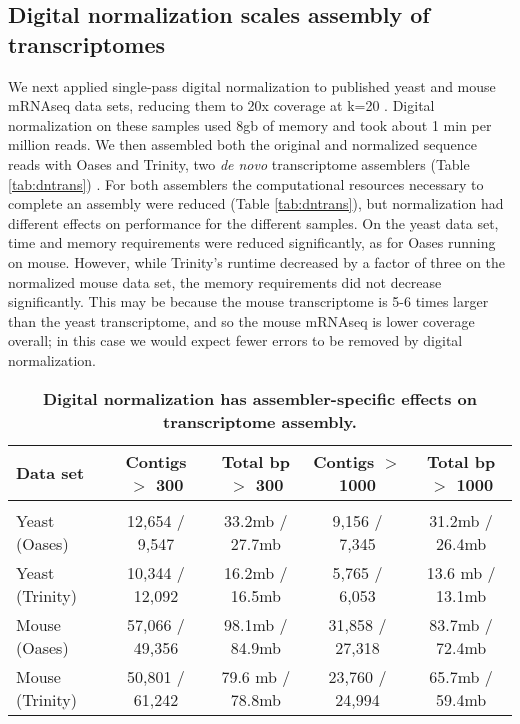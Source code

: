 \subsection{Digital normalization scales assembly of transcriptomes}


We next applied single-pass digital normalization to published yeast and mouse
mRNAseq data sets, reducing them to 20x coverage at k=20 \cite{pubmed21572440}.
Digital normalization on these samples used 8gb of memory and took about 1 min
per million reads.  We then assembled both the original and normalized sequence
reads with Oases and Trinity, two {\em de novo} transcriptome assemblers (Table
\ref{tab:dntrans}) \cite{pubmed22368243,pubmed21572440}.
%
For both assemblers the computational resources necessary to complete an
assembly were reduced (Table \ref{tab:dntrans}), but normalization had
different effects on performance for the different samples.  On the yeast data
set, time and memory requirements were reduced significantly, as for Oases
running on mouse.  However, while Trinity's runtime decreased by a factor of
three on the normalized mouse data set, the memory requirements did not
decrease significantly.  This may be because the mouse transcriptome is 5-6
times larger than the yeast transcriptome, and so the mouse mRNAseq is lower
coverage overall; in this case we would expect fewer errors to be removed by
digital normalization.


\begin{table}[!ht]
\small
\caption{
\bf{Digital normalization has assembler-specific effects on transcriptome
assembly.}}


\begin{tabular}{|l|c|c|c|c|}

Data set & Contigs $>$ 300 & Total bp $>$ 300 & Contigs $>$ 1000 & Total bp $>$ 1000 \\
\hline \\
Yeast (Oases) & 12,654 / 9,547 & 33.2mb / 27.7mb & 9,156 / 7,345 & 31.2mb / 26.4mb \\
Yeast (Trinity) & 10,344 / 12,092 & 16.2mb / 16.5mb & 5,765 / 6,053 & 13.6 mb / 13.1mb \\
Mouse (Oases) & 57,066 / 49,356 & 98.1mb / 84.9mb & 31,858 / 27,318 & 83.7mb / 72.4mb \\
Mouse (Trinity) & 50,801 / 61,242 & 79.6 mb / 78.8mb & 23,760 / 24,994 & 65.7mb / 59.4mb \\

\end{tabular}

\begin{flushleft}
\end{flushleft}
\label{tab:dntrans0}
\end{table}


